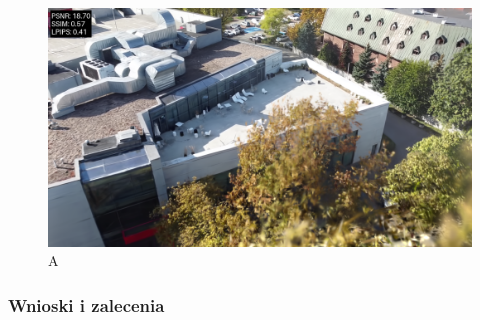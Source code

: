 \begin{figure}[!h]
    \includegraphics[width=\linewidth]{img/res_imgs/eval_with_metrics_0010_14.png}
    \caption{A}\label{fig:eval_14}
\end{figure}

\subsubsection{Wnioski i zalecenia}